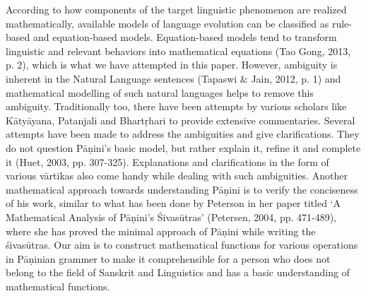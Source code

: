 According to how components of the target linguistic phenomenon are realized mathematically, available models of language evolution can be classified as rule-based and equation-based models. Equation-based models tend to transform linguistic and relevant behaviors into mathematical equations (Tao Gong, 2013, p. 2), which is what we have attempted in this paper. However, ambiguity is inherent in the Natural Language sentences (Tapaswi \& Jain, 2012, p. 1) and mathematical modelling of such natural languages helps to remove this ambiguity. Traditionally too, there have been attempts by various scholars like Kātyāyana, Patanjali and Bhartṛhari to provide extensive commentaries. Several attempts have been made to address the ambiguities and give clarifications. They do not question Pāṇini’s basic model, but rather explain it, refine it and complete it (Huet, 2003, pp. 307-325). Explanations and clarifications in the form of various vārtikas also come handy while dealing with such ambiguities. Another mathematical approach towards understanding Pāṇini is to verify the conciseness of his work, similar to what has been done by Peterson in her paper titled ‘A Mathematical Analysis of Pāṇini's Śivasūtras’ (Petersen, 2004, pp. 471-489), where she has proved the minimal approach of Pāṇini while writing the śivasūtras.
Our aim is to construct mathematical functions for various operations in Pāṇinian grammer to make it comprehensible for a person who does not belong to the field of Sanskrit and Linguistics and has a basic understanding of mathematical functions.
